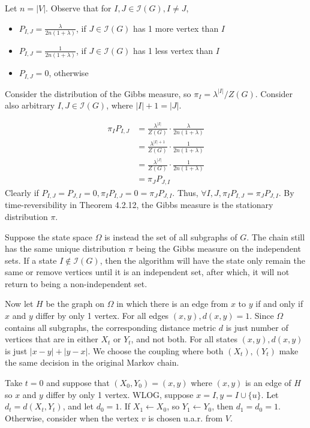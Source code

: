 \documentclass[11pt]{article} %
\begin{document}
Let $n=|V|$. Observe that for $I,J\in\mathcal{I}(G),I\neq J$,
\begin{itemize}
    \item $P_{I,J} = \frac{\lambda}{2n(1+\lambda)}$, if $J\in\mathcal{I}(G)$ has 1 more vertex than $I$
    \item $P_{I,J} = \frac{1}{2n(1+\lambda)}$, if $J\in\mathcal{I}(G)$ has 1 less vertex than $I$
    \item $P_{I,J} = 0$, otherwise
\end{itemize}
Consider the distribution of the Gibbs measure, so $\pi_I = \lambda^{|I|}/Z(G)$.
Consider also arbitrary $I,J\in\mathcal{I}(G)$, where $|I|+1=|J|$.

\begin{equation}
\begin{aligned}
\pi_I P_{I,J} &= \frac{\lambda^{|I|}}{Z(G)}\cdot\frac{\lambda}{2n(1+\lambda)}\\
&=\frac{\lambda^{|I|+1}}{Z(G)}\cdot\frac{1}{2n(1+\lambda)}\\
&=\frac{\lambda^{|J|}}{Z(G)}\cdot\frac{1}{2n(1+\lambda)}\\
&=\pi_J P_{J,I}
\end{aligned}
\end{equation}
Clearly if $P_{I,J} = P_{J,I} = 0, \pi_I P_{I,J} = 0 = \pi_J P_{J,I}$.
Thus, $\forall I,J, \pi_I P_{I,J} = \pi_J P_{J,I}$.
By time-reversibility in Theorem 4.2.12, the Gibbs measure is the stationary distribution $\pi$.

Suppose the state space $\Omega$ is instead the set of all subgraphs of $G$.
The chain still has the same unique distribution $\pi$ being the Gibbs measure on the independent sets.
If a state $I\notin \mathcal{I}(G)$, then the algorithm will have the state only remain the same
or remove vertices until it is an independent set, after which, it will not return to being a non-independent set.

Now let $H$ be the graph on $\Omega$ in which there is an edge from $x$ to $y$ if and only if
$x$ and $y$ differ by only 1 vertex. For all edges $(x,y), d(x, y)=1$.
Since $\Omega$ contains all subgraphs, the corresponding distance metric $d$ 
is just number of vertices that are in either $X_t$ or $Y_t$, and not both.
For all states $(x,y), d (x,y)$ is just $|x-y|+|y-x|$. 
We choose the coupling where both $(X_t), (Y_t)$ make the same decision in the original Markov chain.

\clearpage
Take $t=0$ and suppose that $(X_0,Y_0)=(x,y)$ where $(x,y)$ is an edge of $H$ so $x$ and $y$
differ by only 1 vertex.
WLOG, suppose $x=I,y=I\cup \{u\}$. Let $d_t=d(X_t,Y_t)$, and let $d_0=1$.
If $X_1 \leftarrow X_0$, so $Y_1 \leftarrow Y_0$, then $d_1=d_0=1$.
Otherwise, consider when the vertex $v$ is chosen u.a.r. from $V$.
\end{document}
